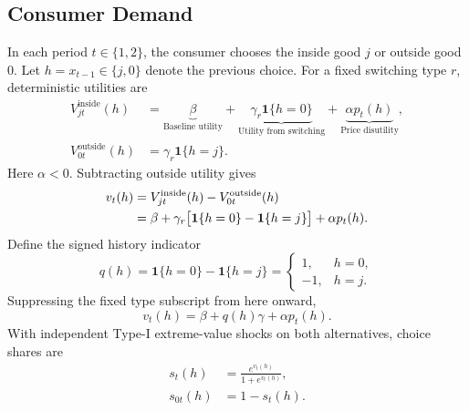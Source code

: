 \documentclass[12pt]{article}
\theoremstyle{definition}
\theoremstyle{remark}
\begin{document}
\subsection{Consumer Demand}
\label{subsec:model-demand}
In each period $t\in\{1,2\}$, the consumer chooses the inside good $j$ or
outside good $0$. Let $h=x_{t-1}\in\{j,0\}$ denote the previous choice.
For a fixed switching type $r$, deterministic utilities are
\begin{align}
 V_{jt}^{\mathrm{inside}}(h)
 &=\underbrace{\beta}_{\text{Baseline utility}}
 +\underbrace{\gamma_r\mathbf{1}\{h=0\}}_{\text{Utility from switching}}
 +\underbrace{\alpha p_t(h)}_{\text{Price disutility}},\\
 V_{0t}^{\mathrm{outside}}(h)
 &=\gamma_r\mathbf{1}\{h=j\}.
\end{align}
Here $\alpha<0$. Subtracting outside utility gives
\begin{align}
 v_t(h)&=V_{jt}^{\mathrm{inside}}(h)-V_{0t}^{\mathrm{outside}}(h)\notag\\
 &=\beta+\gamma_r\bigl[\mathbf{1}\{h=0\}-\mathbf{1}\{h=j\}\bigr]
 +\alpha p_t(h).
\end{align}
Define the signed history indicator
\begin{equation}
 q(h)=\mathbf{1}\{h=0\}-\mathbf{1}\{h=j\}
 =\begin{cases}
  1,&h=0,\\
  -1,&h=j.
 \end{cases}
\end{equation}
Suppressing the fixed type subscript from here onward,
\begin{equation}
 v_t(h)=\beta+q(h)\gamma+\alpha p_t(h).
\end{equation}
With independent Type-I extreme-value shocks on both alternatives, choice shares are
\begin{align}
 s_t(h)&=\frac{e^{v_t(h)}}{1+e^{v_t(h)}},
 \label{eq:supply-share}\\
 s_{0t}(h)&=1-s_t(h).
\end{align}
\end{document}
